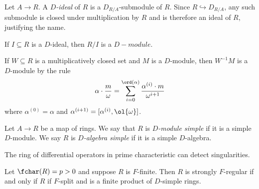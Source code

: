 \begin{defn}\label{defn:D-ideal}
	Let $A\to R$. A \emph{$D$-ideal} of $R$ is a $D_{R/A}$-submodule of $R$. Since $R \hookrightarrow D_{R/A}$, any such submodule is closed under multiplication by $R$ and is therefore an ideal of $R$, justifying the name.
\end{defn}

\begin{example}\label{ex:quotient-is-d-mod}
	If $I \subseteq R$ is a $D$-ideal, then $R/I$ is a $D-module$.
\end{example}

\begin{prop}\label{prop:localization-of-D-mod}
	If $W \subseteq R$ is a multiplicatively closed set and $M$ is a $D$-module, then $W^{-1}M$ is a $D$-module by the rule
	\begin{align*}
		\alpha\cdot \frac{m}{\omega} = \sum_{i = 0}^{\ord(\alpha)} \frac{\alpha^{(i)}\cdot m}{\omega^{i+1}}
	\end{align*}
	where $\alpha^{(0)} = \alpha$ and $\alpha^{(i+1)} = [\alpha^{(i)}, \ol{\omega}]$.
\end{prop}

\begin{defn}\label{defn:D-module-simple}
	Let $A\to R$ be a map of rings. We say that $R$ is \emph{$D$-module simple} if it is a simple $D$-module. We say $R$ is \emph{$D$-algebra simple} if it is a simple $D$-algebra.
\end{defn}

The ring of differential operators in prime characteristic can detect singularities. 

\begin{thm}\label{thm:strongly-F-regular-rings-D-simple}
	Let $\fchar(R) = p > 0$ and suppose $R$ is $F$-finite. Then $R$ is strongly $F$-regular if and only if $R$ if $F$-split and is a finite product of $D$-simple rings.
\end{thm}

\newpage
\printbibliography

